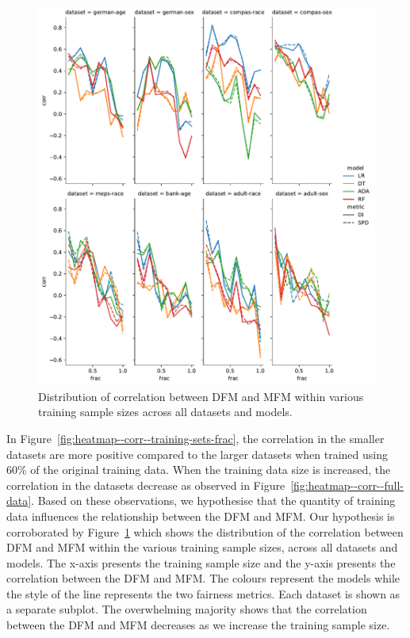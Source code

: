 \documentclass[sigconf,review,anonymous]{acmart}
\begin{document}
\begin{figure}
  \centering
  \includegraphics[width=0.95\linewidth]{lineplot--frac--corr.pdf}
  \caption{Distribution of correlation between DFM and MFM within
  various training sample sizes across all datasets and models.}
  \label{fig:lineplot--frac--corr}
\end{figure}

In Figure \ref{fig:heatmap--corr--training-sets-frac}, the correlation
in the smaller datasets are more positive compared to the larger
datasets when trained using 60\% of the original training data. When
the training data size is increased, the correlation in the datasets
decrease as observed in
Figure \ref{fig:heatmap--corr--full-data}. Based on these
observations, we hypothesise that the quantity of training data
influences the relationship between the DFM and MFM. Our hypothesis is
corroborated by Figure \ref{fig:lineplot--frac--corr} which shows the
distribution of the correlation between DFM and MFM within the various
training sample sizes, across all datasets and models. The x-axis
presents the training sample size and the y-axis presents the
correlation between the DFM and MFM. The colours represent the models
while the style of the line represents the two fairness metrics. Each
dataset is shown as a separate subplot. The overwhelming majority
shows that the correlation between the DFM and MFM decreases as we
increase the training sample size.
\end{document}
